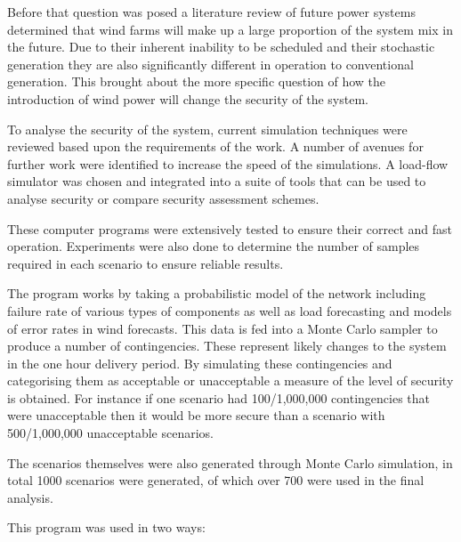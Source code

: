 \documentclass[a4paper,oneside,12pt]{report}
\begin{document}
Before that question was posed a literature review of future power systems determined that wind farms will make up a large proportion of the system mix in the future. Due to their inherent inability to be scheduled and their stochastic generation they are also significantly different in operation to conventional generation. This brought about the more specific question of how the introduction of wind power will change the security of the system.

To analyse the security of the system, current simulation techniques were reviewed based upon the requirements of the work. A number of avenues for further work were identified to increase the speed of the simulations. A load-flow simulator was chosen and integrated into a suite of tools that can be used to analyse security or compare security assessment schemes. 

These computer programs were extensively tested to ensure their correct and fast operation. Experiments were also done to determine the number of samples required in each scenario to ensure reliable results. 

The program works by taking a probabilistic model of the network including failure rate of various types of components as well as load forecasting and models of error rates in wind forecasts. This data is fed into a Monte Carlo sampler to produce a number of contingencies. These represent likely changes to the system in the one hour delivery period. By simulating these contingencies and categorising them as acceptable or unacceptable a measure of the level of security is obtained. For instance if one scenario had 100/1,000,000 contingencies that were unacceptable then it would be more secure than a scenario with 500/1,000,000 unacceptable scenarios. 

The scenarios themselves were also generated through Monte Carlo simulation, in total 1000 scenarios were generated, of which over 700 were used in the final analysis.

This program was used in two ways: 
\end{document}
